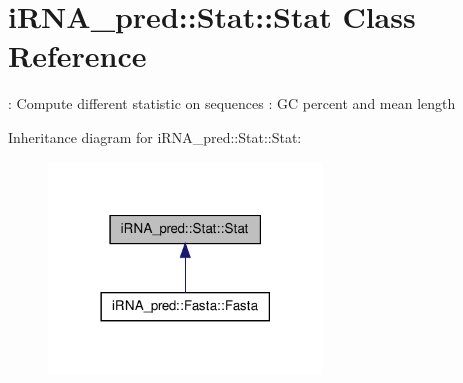 \hypertarget{classiRNA__pred_1_1Stat_1_1Stat}{
\section{i\-R\-N\-A\-\_\-pred\-:\-:\-Stat\-:\-:\-Stat \-Class \-Reference}
\label{classiRNA__pred_1_1Stat_1_1Stat}
}


\-: \-Compute different statistic on sequences \-: \-G\-C percent and mean length  




\-Inheritance diagram for i\-R\-N\-A\-\_\-pred\-:\-:\-Stat\-:\-:\-Stat\-:
\nopagebreak
\begin{figure}[H]
\begin{center}
\leavevmode
\includegraphics[width=206pt]{classiRNA__pred_1_1Stat_1_1Stat__inherit__graph}
\end{center}
\end{figure}
